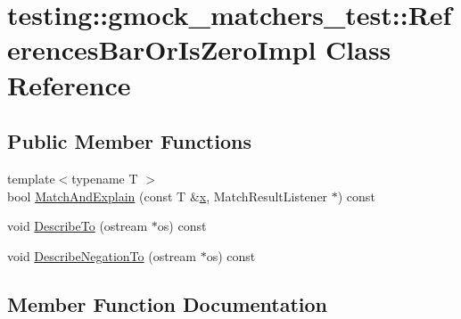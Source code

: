 \hypertarget{classtesting_1_1gmock__matchers__test_1_1_references_bar_or_is_zero_impl}{}\section{testing\+::gmock\+\_\+matchers\+\_\+test\+::References\+Bar\+Or\+Is\+Zero\+Impl Class Reference}
\label{classtesting_1_1gmock__matchers__test_1_1_references_bar_or_is_zero_impl}
\subsection*{Public Member Functions}
\begin{DoxyCompactItemize}
\item 
{\footnotesize template$<$typename T $>$ }\\bool \mbox{\hyperlink{classtesting_1_1gmock__matchers__test_1_1_references_bar_or_is_zero_impl_ac74ff2f707bebea05a995beb77c77041}{Match\+And\+Explain}} (const T \&\mbox{\hyperlink{_obj__test_2lib_2googletest-master_2googlemock_2test_2gmock-matchers__test_8cc_a6150e0515f7202e2fb518f7206ed97dc}{x}}, Match\+Result\+Listener $\ast$) const
\item 
void \mbox{\hyperlink{classtesting_1_1gmock__matchers__test_1_1_references_bar_or_is_zero_impl_a8d8496ad72753723598efd45e6a4dcbf}{Describe\+To}} (ostream $\ast$os) const
\item 
void \mbox{\hyperlink{classtesting_1_1gmock__matchers__test_1_1_references_bar_or_is_zero_impl_a849b65d96bf7a31b7b0e81005e466605}{Describe\+Negation\+To}} (ostream $\ast$os) const
\end{DoxyCompactItemize}


\subsection{Member Function Documentation}
\mbox{\label{classtesting_1_1gmock__matchers__test_1_1_references_bar_or_is_zero_impl_a849b65d96bf7a31b7b0e81005e466605}} 
